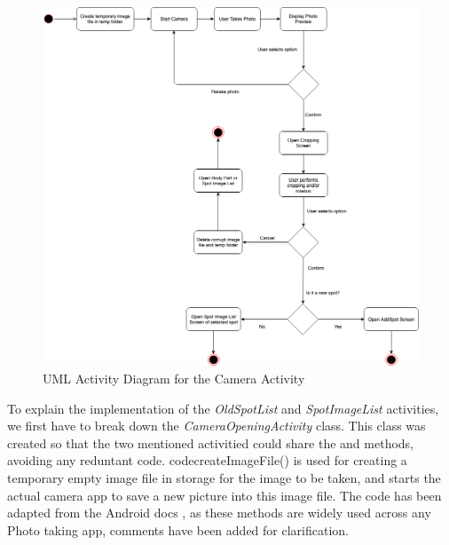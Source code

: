 \begin{figure}
    \includegraphics[width=1.2\textwidth, center]{figures/CameraScreen.png}
    \caption{UML Activity Diagram for the Camera Activity}
    \label{fig:CameraScreen}
\end{figure}
To explain the implementation of the \emph{OldSpotList} and \emph{SpotImageList} activities, we first have to break down the \emph{CameraOpeningActivity} class. This class was created so that the two mentioned activitied could share the  and  methods, avoiding any reduntant code. code{createImageFile()} is used for creating a temporary empty image file in storage for the image to be taken, and  starts the actual camera app to save a new picture into this image file. The code has been adapted from the Android docs \cite{androiddevelopers3}, as these methods are widely used across any Photo taking app, comments have been added for clarification.

